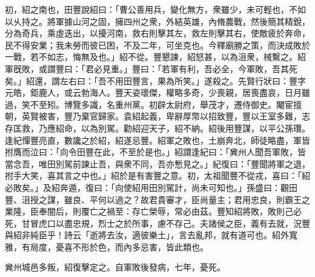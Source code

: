 \begin{pinyinscope}
初，紹之南也，田豐說紹曰：「曹公善用兵，變化無方，衆雖少，未可輕也，不如以乆持之。將軍據山河之固，擁四州之衆，外結英雄，內脩農戰，然後簡其精銳，分為奇兵，乘虛迭出，以擾河南，救右則擊其左，救左則擊其右，使敵疲於奔命，民不得安業；我未勞而彼已困，不及二年，可坐克也。今釋廟勝之策，而決成敗於一戰，若不如志，悔無及也。」紹不從。豐懇諫，紹怒甚，以為沮衆，械繫之。紹軍旣敗，或謂豐曰：「君必見重。」豐曰：「若軍有利，吾必全，今軍敗，吾其死矣。」紹還，謂左右曰：「吾不用田豐言，果為所笑。」遂殺之。先賢行狀曰：豐字元皓，鉅鹿人，或云勃海人。豐天姿瓌傑，權略多奇，少喪親，居喪盡哀，日月雖過，笑不至矧。博覽多識，名重州黨。初辟太尉府，舉茂才，遷侍御史。閹宦擅朝，英賢被害，豐乃棄官歸家。袁紹起義，卑辭厚幣以招致豐，豐以王室多難，志存匡救，乃應紹命，以為別駕。勸紹迎天子，紹不納。紹後用豐謀，以平公孫瓚。逢紀憚豐亮直，數讒之於紹，紹遂忌豐。紹軍之敗也，土崩奔北，師徒略盡，軍皆拊膺而泣曰：「向令田豐在此，不至於是也。」紹謂逢紀曰：「兾州人聞吾軍敗，皆當念吾，唯田別駕前諫止吾，與衆不同，吾亦慙見之。」紀復曰：「豐聞將軍之退，拊手大笑，喜其言之中也。」紹於是有害豐之意。初，太祖聞豐不從戎，喜曰：「紹必敗矣。」及紹奔遁，復曰：「向使紹用田別駕計，尚未可知也。」孫盛曰：觀田豐、沮授之謀，雖良、平何以過之？故君貴審才，臣尚量主；君用忠良，則霸王之業隆，臣奉闇后，則覆亡之禍至：存亡榮辱，常必由茲。豐知紹將敗，敗則己必死，甘冒虎口以盡忠規，烈士之於所事，慮不存己。夫諸侯之臣，義有去就，況豐與紹非純臣乎！詩云「逝將去汝，適彼樂土」，言去亂邦，就有道可也。紹外寬雅，有局度，憂喜不形於色，而內多忌害，皆此類也。

兾州城邑多叛，紹復擊定之。自軍敗後發病，七年，憂死。


\end{pinyinscope}
